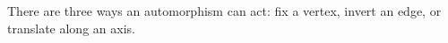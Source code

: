 \documentclass[preview]{standalone}
\begin{document}
\begin{center}
There are three ways an automorphism can act: fix a vertex, invert an edge, or translate along an axis.\phantom{ttt}
\end{center}
\end{document}
